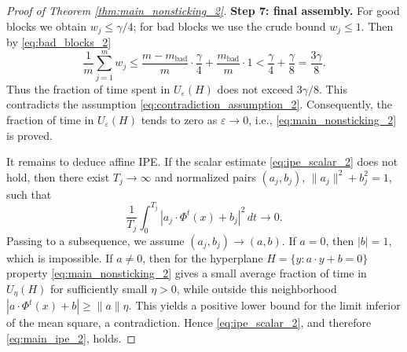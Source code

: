\documentclass[11pt]{article}
\newcommand{\eps}{\varepsilon}
\newcommand{\dd}{\,d}
\theoremstyle{thmstyleone}
\theoremstyle{thmstyletwo}
\theoremstyle{thmstylethree}
\begin{document}
\begin{appendices}
\begin{proof}[Proof of Theorem \ref{thm:main_nonsticking_2}]
\textbf{Step 7: final assembly.}
For good blocks we obtain $w_j\le\gamma/4$; for bad blocks we use the crude bound $w_j\le1$. Then by \eqref{eq:bad_blocks_2}
\[
    \frac1m\sum_{j=1}^m w_j
    \le\frac{m-m_{\mathrm{bad}}}{m}\cdot\frac\gamma4
    +\frac{m_{\mathrm{bad}}}{m}\cdot1
    <\frac\gamma4+\frac\gamma8
    =\frac{3\gamma}{8}.
\]
Thus the fraction of time spent in $U_\eps(H)$ does not exceed $3\gamma/8$. This contradicts the assumption \eqref{eq:contradiction_assumption_2}. Consequently, the fraction of time in $U_\eps(H)$ tends to zero as $\eps\to0$, i.e., \eqref{eq:main_nonsticking_2} is proved.


It remains to deduce affine IPE. If the scalar estimate \eqref{eq:ipe_scalar_2} does not hold, then there exist $T_j\to\infty$ and normalized pairs $(a_j,b_j)$, $\|a_j\|^2+b_j^2=1$, such that
\[
    \frac1{T_j}\int_0^{T_j}|a_j\cdot \Phi^t(x)+b_j|^2\dd t\to0.
\]
Passing to a subsequence, we assume $(a_j,b_j)\to(a,b)$. If $a=0$, then $|b|=1$, which is impossible. If $a\ne0$, then for the hyperplane $H=\{y:a\cdot y+b=0\}$ property \eqref{eq:main_nonsticking_2} gives a small average fraction of time in $U_\eta(H)$ for sufficiently small $\eta>0$, while outside this neighborhood $|a\cdot \Phi^t(x)+b|\ge \|a\|\eta$. This yields a positive lower bound for the limit inferior of the mean square, a contradiction. Hence \eqref{eq:ipe_scalar_2}, and therefore \eqref{eq:main_ipe_2}, holds.
\end{proof}


\end{appendices}
\end{document}
